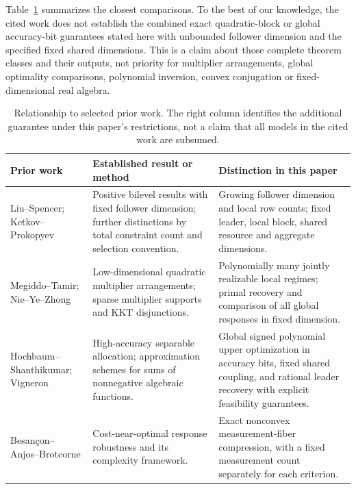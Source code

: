 Table~\ref{tab:prior-comparison} summarizes the closest comparisons.
To the best of our knowledge, the cited work does not establish the combined
exact quadratic-block or global accuracy-bit guarantees stated here with
unbounded follower dimension and the specified fixed shared dimensions.
This is a claim about those complete theorem classes and their outputs,
not priority for multiplier arrangements, global optimality comparisons,
polynomial inversion, convex conjugation or fixed-dimensional real algebra.

\begin{table}[t]
\centering\small
\caption{Relationship to selected prior work. The right column identifies the
additional guarantee under this paper's restrictions, not a claim that all
models in the cited work are subsumed.}
\label{tab:prior-comparison}
\begin{tabular}{@{}>{\raggedright\arraybackslash}p{.23\linewidth}>{\raggedright\arraybackslash}p{.32\linewidth}>{\raggedright\arraybackslash}p{.39\linewidth}@{}}
\toprule
Prior work & Established result or method & Distinction in this paper\\\midrule
Liu--Spencer; Ketkov--Prokopyev
\cite{LiuSpencer1995,KetkovProkopyev2026} &
Positive bilevel results with fixed follower dimension; further distinctions
by total constraint count and selection convention. &
Growing follower dimension and local row counts; fixed leader, local block,
shared resource and aggregate dimensions.\\[5pt]
Megiddo--Tamir; Nie--Ye--Zhong
\cite{MegiddoTamir1993,NieYeZhong2026} &
Low-dimensional quadratic multiplier arrangements; sparse multiplier
supports and KKT disjunctions. &
Polynomially many jointly realizable local regimes; primal recovery and
comparison of all global responses in fixed dimension.\\[5pt]
Hochbaum--Shanthikumar; Vigneron
\cite{HochbaumShanthikumar1990,Vigneron2014} &
High-accuracy separable allocation; approximation schemes for sums of
nonnegative algebraic functions. &
Global signed polynomial upper optimization in accuracy bits, fixed shared
coupling, and rational leader recovery with explicit feasibility guarantees.\\[5pt]
Besan\c{c}on--Anjos--Brotcorne
\cite{BesanconAnjosBrotcorne2024,BesanconAnjosBrotcorne2021} &
Cost-near-optimal response robustness and its complexity framework. &
Exact nonconvex measurement-fiber compression, with a fixed measurement count
separately for each criterion.\\[5pt]

\end{tabular}
\end{table}
